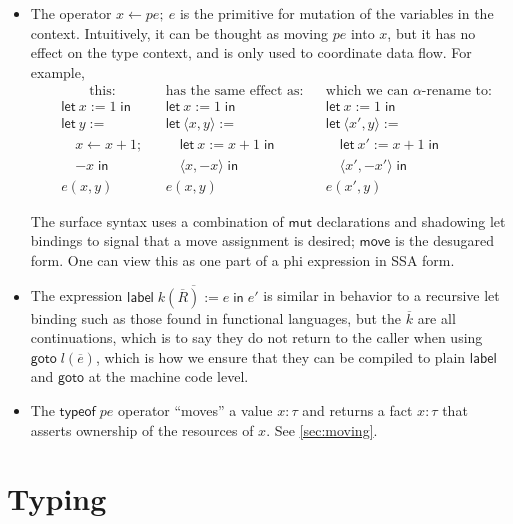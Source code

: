 \documentclass[acmsmall,nonacm]{acmart}
\begin{document}
\begin{itemize}
  \item The operator $x\gets pe;\ e$ is the primitive for mutation of the variables in the context. Intuitively, it can be thought as moving $pe$ into $x$, but it has no effect on the type context, and is only used to coordinate data flow. For example,
  \begin{align*}
    &\qquad\mbox{this:}
      &&\!\!\!\!\!\!\mbox{has the same effect as:}
        &&\!\!\!\!\!\!\mbox{which we can $\alpha$-rename to:}\\
    &\mathsf{let}\ x := 1\;\mathsf{in}
      &&\mathsf{let}\ x := 1\;\mathsf{in}
        &&\mathsf{let}\ x := 1\;\mathsf{in}\\
    &\mathsf{let}\ y :=
      &&\mathsf{let}\ \langle x,y\rangle :=
        &&\mathsf{let}\ \langle x',y\rangle :=\\
    &\quad x \gets x+1;
      &&\quad \mathsf{let}\ x := x+1\;\mathsf{in}\;
        &&\quad \mathsf{let}\ x' := x+1\;\mathsf{in}\;\\
    &\quad {-x}\;\mathsf{in}
      &&\quad \langle x,-x\rangle\;\mathsf{in}
        &&\quad \langle x',-x'\rangle\;\mathsf{in}\\
    &e(x,y)
      &&e(x,y)
        &&e(x',y)
  \end{align*}

  The surface syntax uses a combination of $\mathsf{mut}$ declarations and shadowing let bindings to signal that a move assignment is desired; $\mathsf{move}$ is the desugared form.
  One can view this as one part of a phi expression in SSA form.

  \item The expression $\mathsf{label}\;\overline{k(\overline{R}):=e}\;\mathsf{in}\;e'$ is similar in behavior to a recursive let binding such as those found in functional languages, but the $\overline{k}$ are all continuations, which is to say they do not return to the caller when using $\mathsf{goto}\;l(\overline{e})$, which is how we ensure that they can be compiled to plain $\mathsf{label}$ and $\mathsf{goto}$ at the machine code level.

  \item The $\mathsf{typeof}\;pe$ operator ``moves'' a value $x:\tau$ and returns a fact $\boxed{x:\tau}$ that asserts ownership of the resources of $x$. See \ref{sec:moving}.
\end{itemize}

\section{Typing}
\end{document}
